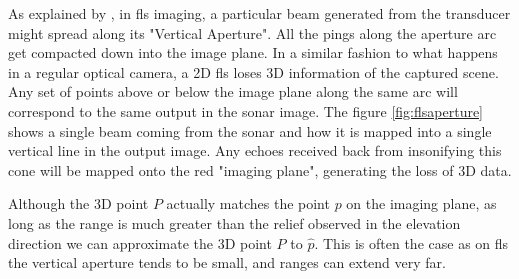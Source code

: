 As explained by \citeauthor{Hurtos2015}\cite{Hurtos2015}, in \acrfull{fls} imaging, a particular beam generated from the transducer might spread along its "Vertical Aperture". All the pings along the aperture arc get compacted down into the image plane. In a similar fashion to what happens in a regular optical camera, a 2D \acrfull{fls} loses 3D information of the captured scene. Any set of points above or below the image plane along the same arc will correspond to the same output in the sonar image. The figure \ref{fig:flsaperture} shows a single beam coming from the sonar and how it is mapped into a single vertical line in the output image. Any echoes received back from insonifying this cone will be mapped onto the red "imaging plane", generating the loss of 3D data. 

Although the 3D point \(P\) actually matches the point \(p\) on the imaging plane, as long as the range is much greater than the relief observed in the elevation direction we can approximate the 3D point \(P\) to \(\hat{p}\). This is often the case as on \acrshort{fls} the vertical aperture tends to be small, and ranges can extend very far.


